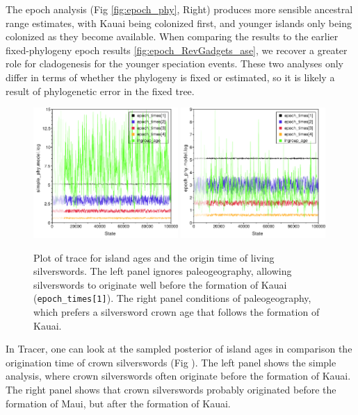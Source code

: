 The epoch analysis (Fig \ref{fig:epoch_phy}, Right) produces more sensible ancestral range estimates, with Kauai being colonized first, and younger islands only being colonized as they become available.
When comparing the results to the earlier fixed-phylogeny epoch results \ref{fig:epoch_RevGadgets_ase}, we recover a greater role for cladogenesis for the younger speciation events.
These two analyses only differ in terms of whether the phylogeny is fixed or estimated, so it is likely a result of phylogenetic error in the fixed tree.

\begin{figure}[!h]
\centering
\includegraphics[width=0.49\textwidth]{figures/fig_simple_ages.pdf} \includegraphics[width=0.49\textwidth]{figures/fig_epoch_ages.pdf} 

\caption{Plot of trace for island ages and the origin time of living silverswords. The left panel ignores paleogeography, allowing silverswords to originate well before the formation of Kauai ({\tt epoch\_times[1]}). The right panel conditions of paleogeography, which prefers a silversword crown age that follows the formation of Kauai.}
\label{fig:epoch_ages}
\end{figure}

In Tracer, one can look at the sampled posterior of island ages in comparison the origination time of crown silverswords (Fig \label{fig:epoch_ages}).
The left panel shows the simple analysis, where crown silverswords often originate before the formation of Kauai.
The right panel shows that crown silverswords probably originated before the formation of Maui, but after the formation of Kauai.

